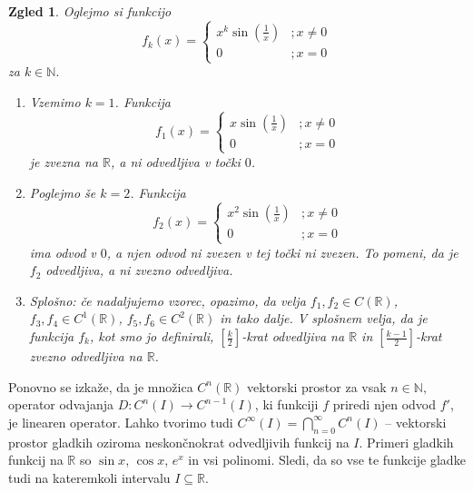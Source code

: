 \documentclass[10pt, a4paper]{article}
\newtheorem{zgled}[izr]{Zgled}
\newcommand{\N}{\mathbb {N}}
\newcommand{\R}{\mathbb {R}}
\begin{document}
\begin{zgled}
    Oglejmo si funkcijo
    $$f_k(x) = \begin{cases}
        x^k \sin \left(\frac{1}{x}\right) &; x \neq 0\\
        0 &; x = 0
    \end{cases}$$ za $k \in \N.$
    \begin{enumerate}
        \item Vzemimo $k = 1$. Funkcija 
        $$f_1(x) = \begin{cases}
            x \sin \left(\frac{1}{x}\right) &; x \neq 0\\
            0 &; x = 0
        \end{cases}$$
        je zvezna na $\R$, a ni odvedljiva v točki $0$.
        \item Poglejmo še $k = 2$. Funkcija 
        $$f_2(x) = \begin{cases}
            x^2 \sin \left(\frac{1}{x}\right) &; x \neq 0\\
            0 &; x = 0
        \end{cases}$$
        ima odvod v $0$, a njen odvod ni zvezen v tej točki ni zvezen.
        To pomeni, da je $f_2$ odvedljiva, a ni zvezno odvedljiva.
        \item Splošno: če nadaljujemo vzorec, opazimo, da velja $f_1, f_2 \in C(\R)$, $f_3, f_4 \in C^1 (\R)$, $f_5, f_6 \in C^2 (\R)$ in tako dalje.
        V splošnem velja, da je funkcija $f_k$, kot smo jo definirali, $\left[\frac{k}{2}\right]$-krat odvedljiva na $\R$ in $\left[\frac{k - 1}{2}\right]$-krat zvezno odvedljiva na $\R$.
    \end{enumerate}
\end{zgled}

Ponovno se izkaže, da je množica $C^n (\R)$ vektorski prostor za vsak $n \in \N,$
operator odvajanja $D: C^n (I) \rightarrow C^{n-1} (I)$, ki funkciji $f$ priredi njen odvod $f'$, je linearen operator.
Lahko tvorimo tudi $C^{\infty} (I) = \bigcap_{n = 0} ^{\infty} C^n (I)$ -- vektorski prostor gladkih oziroma neskončnokrat odvedljivih funkcij na $I$.
Primeri gladkih funkcij na $\R$ so $\sin x$, $\cos x$, $e^x$ in vsi polinomi.
Sledi, da so vse te funkcije gladke tudi na kateremkoli intervalu $I \subseteq \R$.
\end{document}
